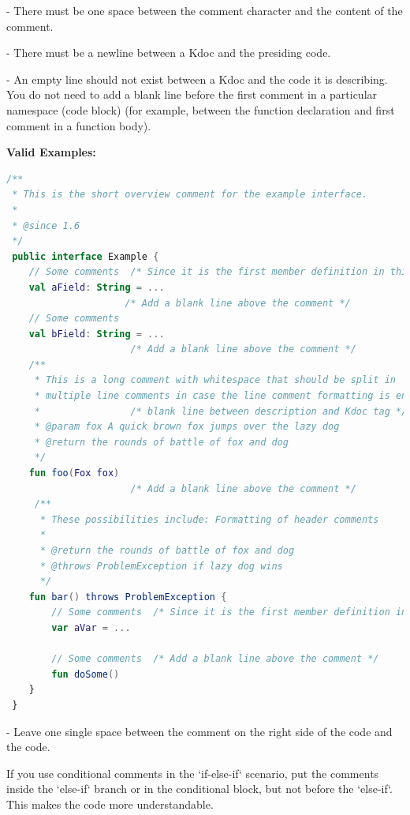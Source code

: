 - There must be one space between the comment character and the content of the comment.

- There must be a newline between a Kdoc and the presiding code.

- An empty line should not exist between a Kdoc and the code it is describing. You do not need to add a blank line before the first comment in a particular namespace (code block) (for example, between the function declaration and first comment in a function body).



\textbf{Valid Examples:}



\begin{lstlisting}[language=Kotlin]
/** 
 * This is the short overview comment for the example interface.
 * 
 * @since 1.6
 */
 public interface Example {
    // Some comments  /* Since it is the first member definition in this code block, there is no need to add a blank line here */
    val aField: String = ...
                     /* Add a blank line above the comment */
    // Some comments
    val bField: String = ...
                      /* Add a blank line above the comment */
    /**
     * This is a long comment with whitespace that should be split in 
     * multiple line comments in case the line comment formatting is enabled.
     *                /* blank line between description and Kdoc tag */
     * @param fox A quick brown fox jumps over the lazy dog
     * @return the rounds of battle of fox and dog 
     */
    fun foo(Fox fox)
                      /* Add a blank line above the comment */
     /**
      * These possibilities include: Formatting of header comments
      * 
      * @return the rounds of battle of fox and dog
      * @throws ProblemException if lazy dog wins
      */
    fun bar() throws ProblemException {
        // Some comments  /* Since it is the first member definition in this range, there is no need to add a blank line here */
        var aVar = ...

        // Some comments  /* Add a blank line above the comment */            
        fun doSome()
    }
 }
\end{lstlisting}


- Leave one single space between the comment on the right side of the code and the code. 

If you use conditional comments in the `if-else-if` scenario, put the comments inside the `else-if` branch or in the conditional block, but not before the `else-if`. This makes the code more understandable.


